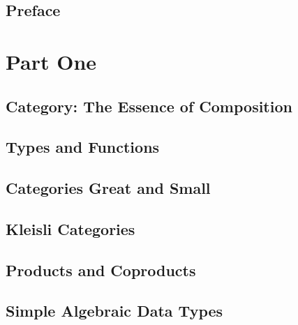 


\frontmatter
\tableofcontents


\chapter*{Preface}
\label{Preface}


\mainmatter

\part*{Part One}

\chapter{Category: The Essence of Composition}\label{category-the-essence-of-composition}


\chapter{Types and Functions}\label{types-and-functions}


\chapter{Categories Great and Small}\label{categories-great-and-small}


\chapter{Kleisli Categories}\label{kleisli-categories}


\chapter{Products and Coproducts}\label{products-and-coproducts}


\chapter{Simple Algebraic Data Types}\label{simple-algebraic-data-types}



